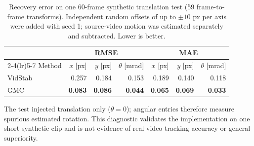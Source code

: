 \begin{table}[H]
  \centering
  \caption{Recovery error on one 60-frame synthetic translation test (59
  frame-to-frame transforms).  Independent random offsets of up to
  $\pm 10$ px per axis were added with seed 1; source-video motion was
  estimated separately and subtracted.  Lower is better.}
  \label{tab:synthetic-motion-recovery}
  \small
  \setlength{\tabcolsep}{5pt}
  \begin{tabular}{lrrrrrr}
    \toprule
    & \multicolumn{3}{c}{RMSE} & \multicolumn{3}{c}{MAE} \\
    \cmidrule(lr){2-4}\cmidrule(lr){5-7}
    Method & $x$ [px] & $y$ [px] & $\theta$ [mrad]
           & $x$ [px] & $y$ [px] & $\theta$ [mrad] \\
    \midrule
    VidStab & 0.257 & 0.184 & 0.153 & 0.189 & 0.140 & 0.118 \\
    GMC     & \textbf{0.083} & \textbf{0.086} & \textbf{0.044}
            & \textbf{0.065} & \textbf{0.069} & \textbf{0.033} \\
    \bottomrule
  \end{tabular}
  \vspace{2pt}

  \parbox{0.94\linewidth}{\footnotesize The test injected translation only
  ($\theta=0$); angular entries therefore measure spurious estimated rotation.
  This diagnostic validates the implementation on one short synthetic clip and
  is not evidence of real-video tracking accuracy or general superiority.}
\end{table}
